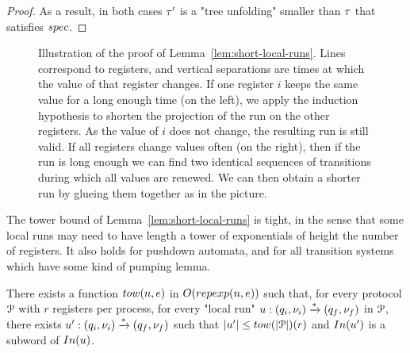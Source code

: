 \begin{proof}
	As a result, in both cases $\tau'$ is a "tree unfolding" smaller than $\tau$ that satisfies $\spec$. 
\end{proof}
\fi

\begin{figure}
	
	\caption{Illustration of the proof of Lemma~\ref{lem:short-local-runs}. Lines correspond to registers, and vertical separations are times at which the value of that register changes. If one register $i$ keeps the same value for a long enough time (on the left), we apply the induction hypothesis to shorten the projection of the run on the other registers. As the value of $i$ does not change, the resulting run is still valid. If all registers change values often (on the right), then if the run is long enough we can find two identical sequences of transitions during which all values are renewed. We can then obtain a shorter run by glueing them together as in the picture.}
\end{figure}


\begin{remark}
	The tower bound of Lemma~\ref{lem:short-local-runs} is tight, in the sense that some local runs may need to have length a tower of exponentials of height the number of registers.
	It also holds for pushdown automata, and for all transition systems which have some kind of pumping lemma.
\end{remark}

\begin{lemma}
	\label{lem:short-local-runs}
	There exists a function $\towerfun(n, e)$ in $O(\repexp{n}{e})$ such that, for every protocol $\mathcal{P}$ with $r$ registers per process, for every "local run" $u: (q_i, \nu_i) \xrightarrow{*} (q_f, \nu_f)$ in $\mathcal{P}$, there exists $u': (q_i, \nu_i) \xrightarrow{*} (q_f, \nu_f)$ such that $\length{\localrun'} \leq \towerfun(\size{\prot})(r)$ and $\Input{\localrun'}$ is a subword of $\Input{\localrun}$. 
\end{lemma}

